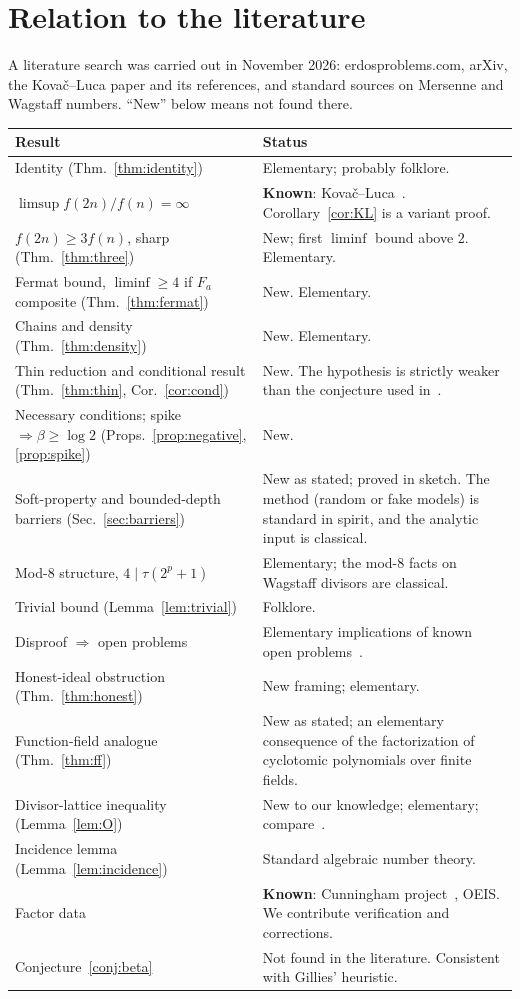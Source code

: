 \documentclass[11pt]{amsart}
\theoremstyle{definition}
\theoremstyle{remark}
\begin{document}
\section{Relation to the literature}\label{sec:novelty}
A literature search was carried out in November 2026: erdosproblems.com, arXiv, the Kova\v{c}--Luca paper and its
references, and standard sources on Mersenne and Wagstaff numbers. ``New'' below means not found there.
\begin{center}
\small
\begin{tabular}{p{6.2cm}p{8.4cm}}
\toprule
Result & Status \\
\midrule
Identity (Thm.~\ref{thm:identity}) & Elementary; probably folklore. \\
$\limsup f(2n)/f(n)=\infty$ & \textbf{Known}: Kova\v{c}--Luca~\cite{KL}. Corollary~\ref{cor:KL} is a variant proof. \\
$f(2n)\ge3f(n)$, sharp (Thm.~\ref{thm:three}) & New; first $\liminf$ bound above $2$. Elementary. \\
Fermat bound, $\liminf\ge4$ if $F_a$ composite (Thm.~\ref{thm:fermat}) & New. Elementary. \\
Chains and density (Thm.~\ref{thm:density}) & New. Elementary. \\
Thin reduction and conditional result (Thm.~\ref{thm:thin}, Cor.~\ref{cor:cond}) & New. The hypothesis is strictly
weaker than the conjecture used in~\cite{KL}. \\
Necessary conditions; spike $\Rightarrow\beta\ge\log2$ (Props.~\ref{prop:negative}, \ref{prop:spike}) & New. \\
Soft-property and bounded-depth barriers (Sec.~\ref{sec:barriers}) & New as stated; proved in sketch. The method
(random or fake models) is standard in spirit, and the analytic input is classical. \\
Mod-8 structure, $4\mid\tau(2^p+1)$ & Elementary; the mod-8 facts on Wagstaff divisors are classical. \\
Trivial bound (Lemma~\ref{lem:trivial}) & Folklore. \\
Disproof $\Rightarrow$ open problems & Elementary implications of known open problems~\cite{Guy}. \\
Honest-ideal obstruction (Thm.~\ref{thm:honest}) & New framing; elementary. \\
Function-field analogue (Thm.~\ref{thm:ff}) & New as stated; an elementary consequence of the factorization of
cyclotomic polynomials over finite fields. \\
Divisor-lattice inequality (Lemma~\ref{lem:O}) & New to our knowledge; elementary; compare~\cite{Le84}. \\
Incidence lemma (Lemma~\ref{lem:incidence}) & Standard algebraic number theory. \\
Factor data & \textbf{Known}: Cunningham project~\cite{Cunningham}, OEIS. We contribute verification and corrections. \\
Conjecture~\ref{conj:beta} & Not found in the literature. Consistent with Gillies' heuristic. \\
\bottomrule
\end{tabular}
\end{center}
\end{document}
